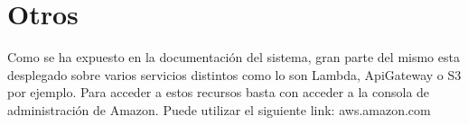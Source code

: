 \documentclass{article}
\begin{document}
\section {Otros}
Como se ha expuesto en la documentación del sistema, gran
parte del mismo esta desplegado sobre varios servicios
distintos como lo son Lambda, ApiGateway o S3 por ejemplo.
Para acceder a estos recursos basta con acceder a la consola
de administración de Amazon. Puede utilizar el
siguiente link: aws.amazon.com
\end{document}
